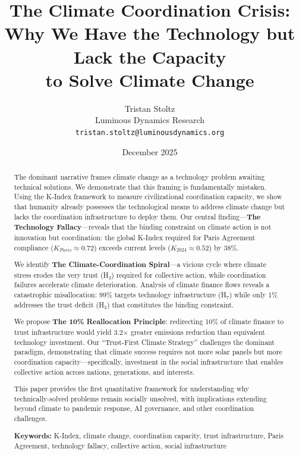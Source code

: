 \documentclass[12pt,a4paper]{article}
\begin{document}
\title{The Climate Coordination Crisis: \\
Why We Have the Technology but Lack the Capacity \\
to Solve Climate Change}

\author{Tristan Stoltz\\
\small{Luminous Dynamics Research}\\
\small{\texttt{tristan.stoltz@luminousdynamics.org}}}

\date{December 2025}

\maketitle

\begin{abstract}
\noindent
The dominant narrative frames climate change as a technology problem awaiting technical solutions. We demonstrate that this framing is fundamentally mistaken. Using the K-Index framework to measure civilizational coordination capacity, we show that humanity already possesses the technological means to address climate change but lacks the coordination infrastructure to deploy them. Our central finding---\textbf{The Technology Fallacy}---reveals that the binding constraint on climate action is not innovation but coordination: the global K-Index required for Paris Agreement compliance ($K_{Paris} \approx 0.72$) exceeds current levels ($K_{2024} \approx 0.52$) by 38\%.

We identify \textbf{The Climate-Coordination Spiral}---a vicious cycle where climate stress erodes the very trust (H$_3$) required for collective action, while coordination failures accelerate climate deterioration. Analysis of climate finance flows reveals a catastrophic misallocation: 99\% targets technology infrastructure (H$_7$) while only 1\% addresses the trust deficit (H$_3$) that constitutes the binding constraint.

We propose \textbf{The 10\% Reallocation Principle}: redirecting 10\% of climate finance to trust infrastructure would yield 3.2$\times$ greater emissions reduction than equivalent technology investment. Our ``Trust-First Climate Strategy'' challenges the dominant paradigm, demonstrating that climate success requires not more solar panels but more coordination capacity---specifically, investment in the social infrastructure that enables collective action across nations, generations, and interests.

This paper provides the first quantitative framework for understanding why technically-solved problems remain socially unsolved, with implications extending beyond climate to pandemic response, AI governance, and other coordination challenges.

\vspace{1em}
\noindent\textbf{Keywords:} K-Index, climate change, coordination capacity, trust infrastructure, Paris Agreement, technology fallacy, collective action, social infrastructure
\end{abstract}
\end{document}
